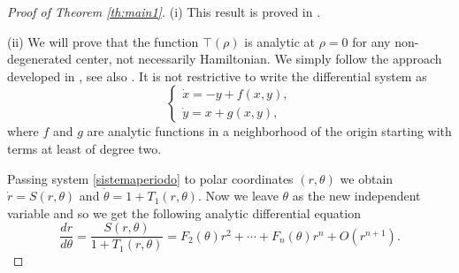 \documentclass[12pt,a4paper,reqno]{amsart}
\begin{document}
\begin{proof}[Proof of Theorem \ref{th:main1}] (i) This result is
proved in \cite{ManVil2002}.

(ii) We will prove that the function $\top(\rho)$ is analytic at
$\rho=0$  for any non-degenerated center, not necessarily
Hamiltonian. We simply follow the approach developed in
\cite{AndroLeontGor1973}, see also \cite{GasGuiMan1997}.  It is not
restrictive to write the differential system as
    \begin{equation}\label{sistemaperiodo}
    \left\{ \begin{array}{l}
    \dot{x}= - y + f(x,y) ,\\
    \dot{y}= x + g(x,y),
    \end{array} \right.
    \end{equation}
    where $ f $ and $ g $ are analytic functions in a neighborhood of the origin starting with  terms at least of degree two.

    Passing system \eqref{sistemaperiodo} to polar coordinates $(r, \theta )$ we obtain $\dot{r} = S(r,\theta )$ and
    $\dot{\theta } = 1+ T_1(r,\theta )$. Now we leave $\theta $ as the new independent variable and so we get the
    following analytic differential equation
    \begin{equation}\label{eqdrdw}
    \dfrac{dr}{d\theta }= \dfrac{S(r,\theta )}{1 + T_1(r,\theta )} = F_2(\theta ) r^2 +\cdots+ F_{n}(\theta ) r^{n} + O(r^{n+1}).
    \end{equation}


\end{proof}
\end{document}
